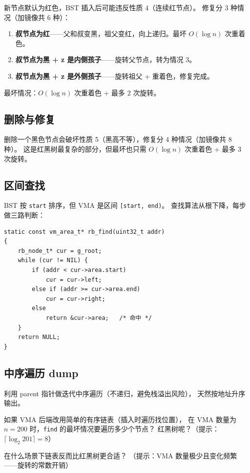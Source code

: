 新节点默认为红色，BST 插入后可能违反性质 4（连续红节点）。
修复分 3 种情况（加镜像共 6 种）：

\begin{enumerate}
  \item \textbf{叔节点为红}——父和叔变黑，祖父变红，向上递归。最坏 $O(\log n)$ 次重着色。
  \item \textbf{叔节点为黑 + z 是内侧孩子}——旋转父节点，转为情况 3。
  \item \textbf{叔节点为黑 + z 是外侧孩子}——旋转祖父 + 重着色，修复完成。
\end{enumerate}

最坏情况：$O(\log n)$ 次重着色 + 最多 2 次旋转。

\subsection{删除与修复}

删除一个黑色节点会破坏性质 5（黑高不等），修复分 4 种情况（加镜像共 8 种）。
这是红黑树最复杂的部分，但最坏也只需 $O(\log n)$ 次重着色 + 最多 3 次旋转。

\subsection{区间查找}

BST 按 \texttt{start} 排序，但 VMA 是区间 \texttt{[start, end)}。
查找算法从根下降，每步做三路判断：

\begin{lstlisting}[style=cstyle]
static const vm_area_t* rb_find(uint32_t addr)
{
    rb_node_t* cur = g_root;
    while (cur != NIL) {
        if (addr < cur->area.start)
            cur = cur->left;
        else if (addr >= cur->area.end)
            cur = cur->right;
        else
            return &cur->area;   /* 命中 */
    }
    return NULL;
}
\end{lstlisting}

\subsection{中序遍历 dump}

利用 parent 指针做迭代中序遍历（不递归，避免栈溢出风险），
天然按地址升序输出。

\begin{thinkbox}
如果 VMA 后端改用简单的有序链表（插入时遍历找位置），
在 VMA 数量为 $n=200$ 时，\texttt{find} 的最坏情况要遍历多少个节点？
红黑树呢？（提示：$\lceil \log_2 201 \rceil = 8$）

在什么场景下链表反而比红黑树更合适？
（提示：VMA 数量极少且变化频繁——旋转的常数开销）
\end{thinkbox}


